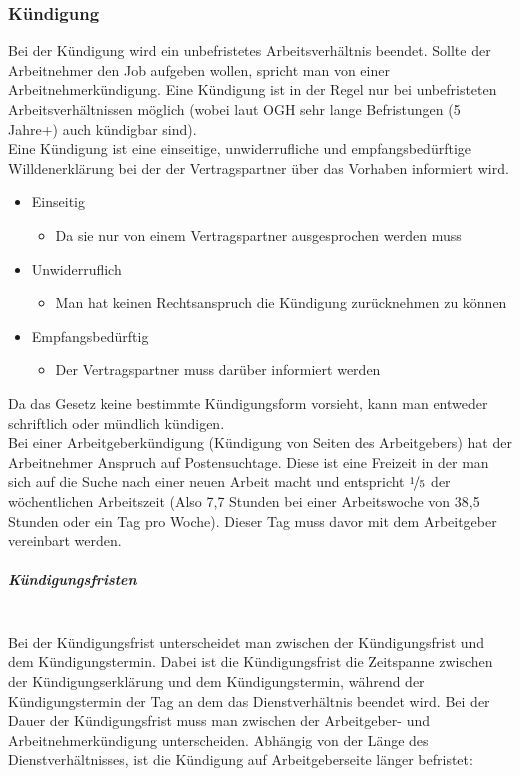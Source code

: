 \documentclass{article}
\newcommand{\subparagraphlb}[1]{\subparagraph{#1}\mbox{}\\}
\begin{document}
	\subsubsection{Kündigung}
	Bei der Kündigung wird ein unbefristetes Arbeitsverhältnis beendet. Sollte der Arbeitnehmer den Job aufgeben wollen, spricht man von einer Arbeitnehmerkündigung. Eine Kündigung ist in der Regel nur bei unbefristeten Arbeitsverhältnissen möglich (wobei laut OGH sehr lange Befristungen (5 Jahre+) auch kündigbar sind). \\
	Eine Kündigung ist eine einseitige, unwiderrufliche und empfangsbedürftige Willdenerklärung bei der der Vertragspartner über das Vorhaben informiert wird. 
	\begin{itemize}
		\item{Einseitig}
		\begin{itemize}
			\item{Da sie nur von einem Vertragspartner ausgesprochen werden muss}
		\end{itemize}
		\item{Unwiderruflich}
		\begin{itemize}
			\item{Man hat keinen Rechtsanspruch die Kündigung zurücknehmen zu können}
		\end{itemize}
		\item{Empfangsbedürftig}
		\begin{itemize}
			\item{Der Vertragspartner muss darüber informiert werden}
		\end{itemize}
	\end{itemize}
	Da das Gesetz keine bestimmte Kündigungsform vorsieht, kann man entweder schriftlich oder mündlich kündigen. \\
	Bei einer Arbeitgeberkündigung (Kündigung von Seiten des Arbeitgebers) hat der Arbeitnehmer Anspruch auf Postensuchtage. Diese ist eine Freizeit in der man sich auf die Suche nach einer neuen Arbeit macht und entspricht $\nicefrac{1}{5}$ der wöchentlichen Arbeitszeit (Also 7,7 Stunden bei einer Arbeitswoche von 38,5 Stunden oder ein Tag pro Woche). Dieser Tag muss davor mit dem Arbeitgeber vereinbart werden.
	\subparagraphlb{Kündigungsfristen}
	Bei der Kündigungsfrist unterscheidet man zwischen der Kündigungsfrist und dem Kündigungstermin. Dabei ist die Kündigungsfrist die Zeitspanne zwischen der Kündigungserklärung und dem Kündigungstermin, während der Kündigungstermin der Tag an dem das Dienstverhältnis beendet wird. Bei der Dauer der Kündigungsfrist muss man zwischen der Arbeitgeber- und Arbeitnehmerkündigung unterscheiden. Abhängig von der Länge des Dienstverhältnisses, ist die Kündigung auf Arbeitgeberseite länger befristet: \\
\end{document}
